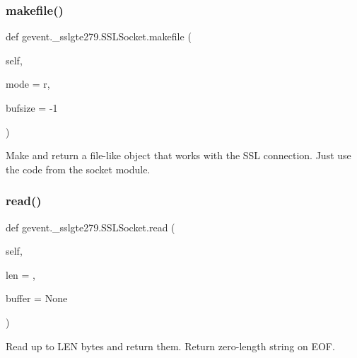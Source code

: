 \subsubsection{\texorpdfstring{makefile()}{makefile()}}
{\footnotesize\ttfamily def gevent.\+\_\+sslgte279.\+S\+S\+L\+Socket.\+makefile (\begin{DoxyParamCaption}\item[{}]{self,  }\item[{}]{mode = {\ttfamily \textquotesingle{}r\textquotesingle{}},  }\item[{}]{bufsize = {\ttfamily -\/1} }\end{DoxyParamCaption})}

\begin{DoxyVerb}Make and return a file-like object that
works with the SSL connection.  Just use the code
from the socket module.\end{DoxyVerb}
 \mbox{\label{classgevent_1_1__sslgte279_1_1_s_s_l_socket_a9636c7efdff4b4dc52cb2fe6f87b8dd7}} 
\subsubsection{\texorpdfstring{read()}{read()}}
{\footnotesize\ttfamily def gevent.\+\_\+sslgte279.\+S\+S\+L\+Socket.\+read (\begin{DoxyParamCaption}\item[{}]{self,  }\item[{}]{len = {},  }\item[{}]{buffer = {\ttfamily None} }\end{DoxyParamCaption})}

\begin{DoxyVerb}Read up to LEN bytes and return them.
Return zero-length string on EOF.\end{DoxyVerb}
 \mbox{\label{classgevent_1_1__sslgte279_1_1_s_s_l_socket_a4d29c78ef2dfa4114a937a37c06f520c}} 
